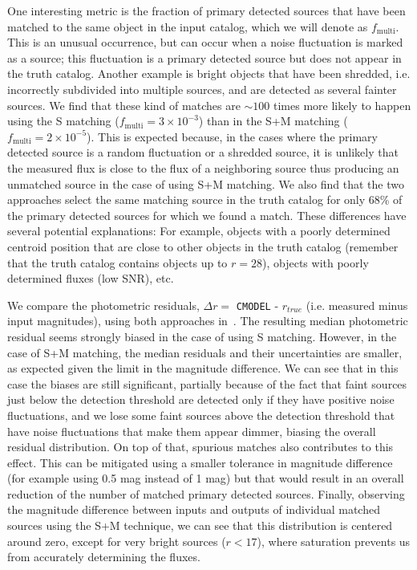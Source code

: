 \documentclass[\docopts]{\docclass}
\begin{document}
One interesting metric is the fraction of primary detected sources that have been matched to the same object in the input catalog, which we will denote as $f_{\mathrm{multi}}$. This is an unusual occurrence, but can occur when a noise fluctuation is marked as a source; this fluctuation is a primary detected source but does not appear in the truth catalog. Another example is bright objects that have been shredded, i.e. incorrectly subdivided into multiple sources, and are detected as several fainter sources. We find that these kind of matches are $\sim 100$ times more likely to happen using the \textsf{S} matching ($f_{\mathrm{multi}} = 3 \times 10^{-3}$) than in the \textsf{S+M} matching ($ f_{\mathrm{multi}} = 2 \times 10^{-5}$). This is expected because, in the cases where the primary detected source is a random fluctuation or a shredded source, it is unlikely that the measured flux is close to the flux of a neighboring source thus producing an unmatched source in the case of using \textsf{S+M} matching. We also find that the two approaches select the same matching source in the truth catalog for only 68\% of the primary detected sources for which we found a match. These differences have several potential explanations: For example, objects with a poorly determined centroid position that are close to other objects in the truth catalog (remember that the truth catalog contains objects up to $r=28$), objects with poorly determined fluxes (low SNR), etc.

We compare the photometric residuals, $\Delta r = $ \texttt{CMODEL} - $r_{true}$ (i.e. measured minus input magnitudes), using both approaches in~. The resulting median photometric residual seems strongly biased in the case of using \textsf{S} matching. However, in the case of \textsf{S+M} matching, the median residuals and their uncertainties are smaller, as expected given the limit in the magnitude difference. We can see that in this case the biases are still significant, partially because of the fact that faint sources just below the detection threshold are detected only if they have positive noise fluctuations, and we lose some faint sources above the detection threshold that have noise fluctuations that make them appear dimmer, biasing the overall residual distribution. On top of that, spurious matches also contributes to this effect. This can be mitigated using a smaller tolerance in magnitude difference (for example using 0.5 mag instead of 1 mag) but that would result in an overall reduction of the number of matched primary detected sources. Finally, observing the magnitude difference between inputs and outputs of individual matched sources using the \textsf{S+M} technique, we can see that this distribution is centered around zero, except for very bright sources ($r < 17$), where saturation prevents us from accurately determining the fluxes. 
\end{document}
